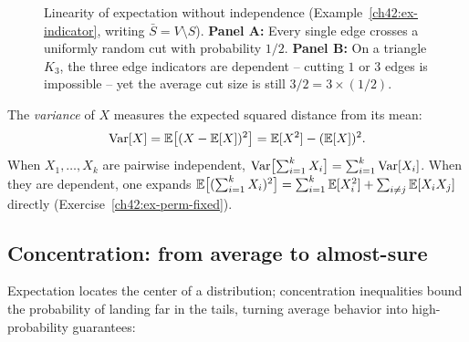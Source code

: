 \begin{figure}[htbp]
\caption{Linearity of expectation without independence (Example~\ref{ch42:ex-indicator}, writing $\bar S = V\setminus S$). \textbf{Panel A:} Every single edge crosses a uniformly random cut with probability $1/2$. \textbf{Panel B:} On a triangle $K_3$, the three edge indicators are dependent -- cutting $1$ or $3$ edges is impossible -- yet the average cut size is still $3/2 = 3 \times (1/2)$.}
\label{ch42:fig-random-cut}
\end{figure}

The \emph{variance} of $X$ measures the expected squared distance from its mean:
\[
  \operatorname{Var}[X] = \operatorname{\mathbb{E}}\bigl[(X - \operatorname{\mathbb{E}}[X])^2\bigr] = \operatorname{\mathbb{E}}[X^2] - (\operatorname{\mathbb{E}}[X])^2.
\]
When $X_1,\dots,X_k$ are pairwise independent, $\operatorname{Var}\bigl[\sum_{i=1}^k X_i\bigr] = \sum_{i=1}^k \operatorname{Var}[X_i]$. When they are dependent, one expands $\operatorname{\mathbb{E}}\bigl[(\sum_{i=1}^k X_i)^2\bigr] = \sum_{i=1}^k \operatorname{\mathbb{E}}[X_i^2] + \sum_{i \ne j} \operatorname{\mathbb{E}}[X_i X_j]$ directly (Exercise~\ref{ch42:ex-perm-fixed}).

\subsection{Concentration: from average to almost-sure}

Expectation locates the center of a distribution; concentration inequalities bound the probability of landing far in the tails, turning average behavior into high-probability guarantees:

